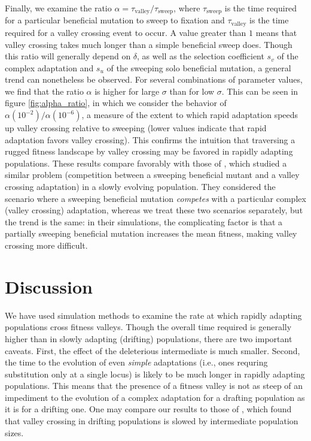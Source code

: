 \documentclass[rmp]{revtex4}
\begin{document}
Finally, we examine the ratio $\alpha = \tau_{\mathrm{valley}}/\tau_{\mathrm{sweep}}$, where $\tau_{\mathrm{sweep}}$ is the time required for a particular beneficial mutation to sweep to fixation and $\tau_{\mathrm{valley}}$ is the time required for a valley crossing event to occur.
A value greater than $1$ means that valley crossing takes much longer than a simple beneficial sweep does.
Though this ratio will generally depend on $\delta$, as well as the selection coefficient $s_v$ of the complex adaptation and $s_u$ of the sweeping solo beneficial mutation, a general trend can nonetheless be observed.
For several combinations of parameter values, we find that the ratio $\alpha$ is higher for large $\sigma$ than for low $\sigma$.
This can be seen in figure \ref{fig:alpha_ratio}, in which we consider the behavior of $\alpha(10^{-2})/\alpha(10^{-6})$, a measure of the extent to which rapid adaptation speeds up valley crossing relative to sweeping (lower values indicate that rapid adaptation favors valley crossing).
This confirms the intuition that traversing a rugged fitness landscape by valley crossing may be favored in rapidly adapting populations.
These results compare favorably with those of \citet{ochs_2015}, which studied a similar problem (competition between a sweeping beneficial mutant and a valley crossing adaptation) in a slowly evolving population.
They considered the scenario where a sweeping beneficial mutation \emph{competes} with a particular complex (valley crossing) adaptation, whereas we treat these two scenarios separately, but the trend is the same: in their simulations, the complicating factor is that a partially sweeping beneficial mutation increases the mean fitness, making valley crossing more difficult.

\section*{Discussion}

We have used simulation methods to examine the rate at which rapidly adapting populations cross fitness valleys.
Though the overall time required is generally higher than in slowly adapting (drifting) populations, there are two important caveats.
First, the effect of the deleterious intermediate is much smaller.
Second, the time to the evolution of even \emph{simple} adaptations (i.e., ones requring substitution only at a single locus) is likely to be much longer in rapidly adapting populations.
This means that the presence of a fitness valley is not as steep of an impediment to the evolution of a complex adaptation for a drafting population as it is for a drifting one.
One may compare our results to those of \citet{ochs_2015}, which found that valley crossing in drifting populations is slowed by intermediate population sizes.
\end{document}
